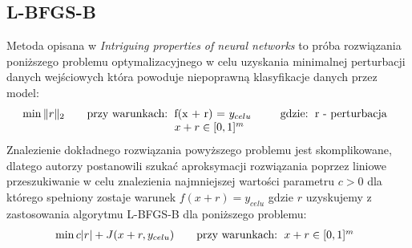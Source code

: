 \documentclass[
    left=2.5cm,         %
    right=2.5cm,        %
    top=2.5cm,          %
    bottom=3cm,         %
    bindingoffset=6mm,  %
    nohyphenation=false %
]{eiti/eiti-thesis}
\begin{document}
\subsection{L-BFGS-B}
Metoda opisana w \textit{Intriguing properties of neural networks}\cite{DBLP:journals/corr/SzegedyZSBEGF13}
to próba rozwiązania poniższego problemu optymalizacyjnego w celu uzyskania minimalnej perturbacji danych wejściowych
która powoduje niepoprawną klasyfikacje danych przez model:
    \begin{equation}
    \min{\| r\|_{2}}
    \qquad\text{przy warunkach:}
    \begin{tabular}[t]{ll}
    f(x + r) = $y_{celu}$ \\
    $x+r \in [0,1]^{m}$ \\
    \end{tabular}
    \qquad\text{gdzie:}
    \begin{tabular}[t]{ll}
    r - perturbacja \\
    \end{tabular}
    \end{equation}
Znalezienie dokładnego rozwiązania powyższego problemu jest skomplikowane, dlatego autorzy postanowili szukać aproksymacji
rozwiązania poprzez liniowe przeszukiwanie w celu znalezienia najmniejszej wartości parametru $c > 0$ dla którego spełniony
zostaje warunek $f(x+r) = y_{celu}$ gdzie $r$ uzyskujemy z zastosowania algorytmu L-BFGS-B dla poniższego problemu:
    \begin{equation}
    \min{c| r| + J(x+r, y_{celu})}
    \qquad\text{przy warunkach:}
    \begin{tabular}[t]{ll}
    $x+r \in [0,1]^{m}$ \\
    \end{tabular}
    \end{equation}
\end{document}
